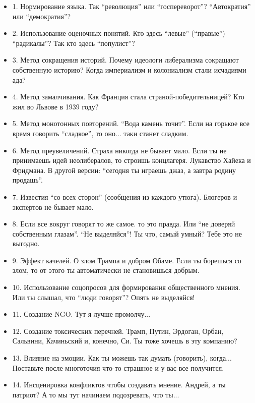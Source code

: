 \begin{itemize}
\begin{itemize}
  \item 1. Нормирование языка. Так \enquote{революция} или \enquote{госпереворот}? \enquote{Автократия} или \enquote{демократия}? 
  \item 2. Использование оценочных понятий. Кто здесь \enquote{левые} (\enquote{правые}) \enquote{радикалы}? Так кто здесь \enquote{популист}? 
  \item 3. Метод сокращения историй. Почему идеологи либерализма сокращают собственную историю? Когда империализм и колониализм стали исчадиями ада? 
  \item 4. Метод замалчивания. Как Франция стала страной-победительницей? Кто жил во Львове в 1939 году? 
  \item 5. Метод монотонных повторений. \enquote{Вода камень точит}. Если на горькое все время говорить \enquote{сладкое}, то оно... таки станет сладким. 
  \item 6. Метод преувеличений. Страха никогда не бывает мало. Если ты не принимаешь идей неолибералов, то строишь концлагеря. Лукавство Хайека и Фридмана. В другой версии: \enquote{сегодня ты играешь джаз, а завтра родину продашь}. 
  \item 7. Известия \enquote{со всех сторон} (сообщения из каждого утюга). Блогеров и экспертов не бывает мало. 
  \item 8. Если все вокруг говорят то же самое. то это правда. Или \enquote{не доверяй собственным глазам}. \enquote{Не выделяйся}! Ты что, самый умный? Тебе это не выгодно. 
  \item 9. Эффект качелей. О злом Трампа и добром Обаме. Если ты борешься со злом, то от этого ты автоматически не становишься добрым. 
  \item 10. Использование соцопросов для формирования общественного мнения. Или ты слышал, что \enquote{люди говорят}? Опять не выделяйся! 
  \item 11. Создание NGO. Тут я лучше промолчу... 
  \item 12. Создание токсических перечней. Трамп, Путин, Эрдоган, Орбан, Сальвини, Качиньский и, конечно, Си. Ты тоже хочешь в эту компанию? 
  \item 13. Влияние на эмоции. Как ты можешь так думать (говорить), когда... Поставьте после многоточия что-то страшное и у вас все получится. 
  \item 14. Инсценировка конфликтов чтобы создавать мнение. Андрей, а ты патриот? А то мы тут начинаем подозревать, что ты... 
\end{itemize}


\end{itemize}

